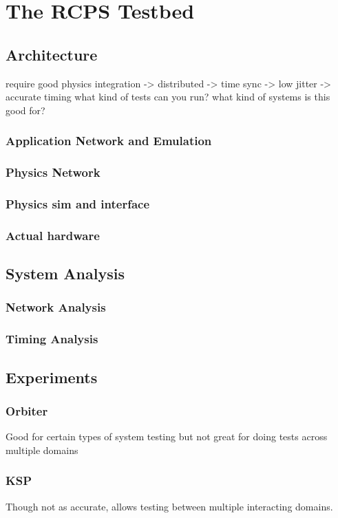 \section{The RCPS Testbed}

\subsection{Architecture}
require good physics integration -> distributed -> time sync -> low jitter -> accurate timing
what kind of tests can you run?
what kind of systems is this good for?
\subsubsection{Application Network and Emulation}
\subsubsection{Physics Network}
\subsubsection{Physics sim and interface}
\subsubsection{Actual hardware}

\subsection{System Analysis}
\subsubsection{Network Analysis}
\subsubsection{Timing Analysis}

\subsection{Experiments}
\subsubsection{Orbiter}
Good for certain types of system testing but not great for doing tests across multiple domains
\subsubsection{KSP}
Though not as accurate, allows testing between multiple interacting domains.


